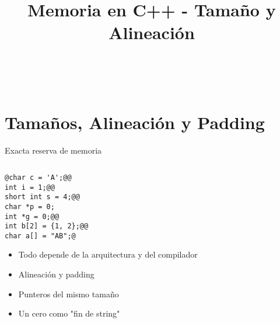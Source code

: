 

\title%
{Memoria en C++ - Tama\~no y Alineaci\'on}


\subject{Memoria en C++ - Tama\~no y Alineaci\'on}




\begin{frame}
   \titlepage
\end{frame}


~%
\section{Tama\~nos, Alineaci\'on y Padding}
\begin{frame}[fragile,label=RM]{Exacta reserva de memoria}
   \begin{columns}
      \begin{column}{.55\linewidth}
         \begin{lstlisting}[style=dimmided]
@char c = 'A';@@
int i = 1;@@
short int s = 4;@@
char *p = 0;
int *g = 0;@@
int b[2] = {1, 2};@@
char a[] = "AB";@
         \end{lstlisting}
   \begin{itemize}
      \item<1-> Todo depende de la arquitectura y del compilador
      \item<2-> Alineaci\'on y padding
      \item<4-> Punteros del mismo tama\~no
      \item<6-> Un cero como "fin de string"
   \end{itemize}

      \end{column}
      \begin{column}{.05\linewidth}
      \end{column}
      \begin{column}{.30\linewidth}
~%
         \begin{tikzpicture}[cell/.style={rectangle,draw=black},
            space/.style={minimum height=1.5em,matrix of nodes,row sep=-\pgflinewidth,column sep=-\pgflinewidth,column 1/.style={font=\ttfamily}},text depth=0.5ex,text height=2ex,nodes in empty cells]


\end{tikzpicture}
\end{column}
\end{columns}
\end{frame}
